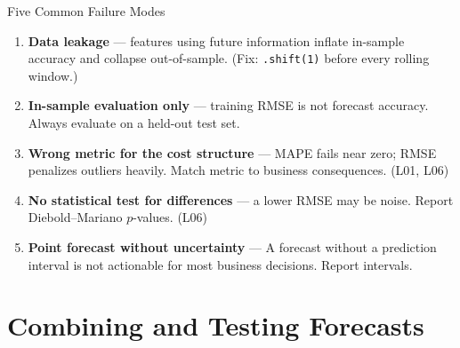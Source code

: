 \documentclass[aspectratio=169, 10pt]{beamer}
\begin{document}
\begin{frame}{Five Common Failure Modes}
  \begin{warningbox}
    {\small
    \begin{enumerate}\setlength{\itemsep}{4pt}
      \item \textbf{Data leakage} --- features using future information
            inflate in-sample accuracy and collapse out-of-sample.
            (Fix: \texttt{.shift(1)} before every rolling window.)
      \item \textbf{In-sample evaluation only} --- training RMSE is not
            forecast accuracy. Always evaluate on a held-out test set.
      \item \textbf{Wrong metric for the cost structure} --- MAPE fails
            near zero; RMSE penalizes outliers heavily. Match metric
            to business consequences. (L01, L06)
      \item \textbf{No statistical test for differences} --- a lower RMSE
            may be noise. Report Diebold--Mariano $p$-values. (L06)
      \item \textbf{Point forecast without uncertainty} --- A forecast
            without a prediction interval is not actionable for most
            business decisions. Report intervals.
    \end{enumerate}
    }
  \end{warningbox}
\end{frame}

\section{Combining and Testing Forecasts}

\end{document}
